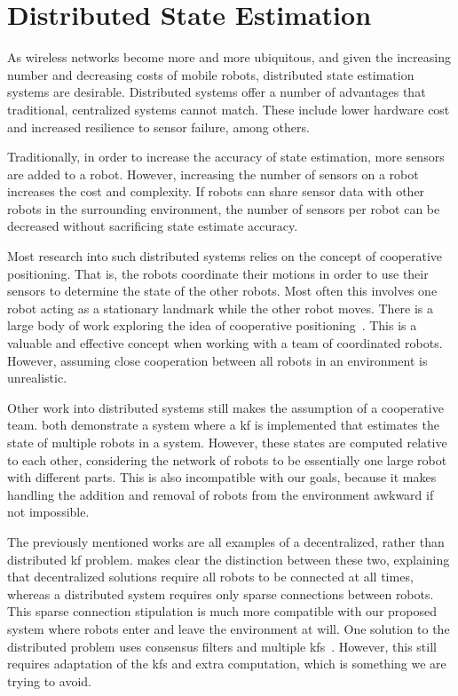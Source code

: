 \documentclass[thesis.tex]{subfile}
\begin{document}
\section{Distributed State Estimation}
As wireless networks become more and more ubiquitous, and given the increasing number and decreasing costs of mobile robots, distributed state estimation systems are desirable. Distributed systems offer a number of advantages that traditional, centralized systems cannot match. These include lower hardware cost and increased resilience to sensor failure, among others.

Traditionally, in order to increase the accuracy of state estimation, more sensors are added to a robot. However, increasing the number of sensors on a robot increases the cost and complexity. If robots can share sensor data with other robots in the surrounding environment, the number of sensors per robot can be decreased without sacrificing state estimate accuracy.

Most research into such distributed systems relies on the concept of cooperative positioning. That is, the robots coordinate their motions in order to use their sensors to determine the state of the other robots. Most often this involves one robot acting as a stationary landmark while the other robot moves.  There is a large body of work exploring the idea of cooperative positioning~\cite{Kurazume1994, Kurazume1996, Kurazume1998, Kurazume2000}. This is a valuable and effective concept when working with a team of coordinated robots. However, assuming close cooperation between all robots in an environment is unrealistic.

Other work into distributed systems still makes the assumption of a cooperative team. \textcite{Sanderson1997, Roumeliotis2002} both demonstrate a system where a \gls{kf} is implemented that estimates the state of multiple robots in a system. However, these states are computed relative to each other, considering the network of robots to be essentially one large robot with different parts. This is also incompatible with our goals, because it makes handling the addition and removal of robots from the environment awkward if not impossible.

The previously mentioned works are all examples of a decentralized, rather than distributed \gls{kf} problem. \textcite{Olfati-Saber2005} makes clear the distinction between these two, explaining that decentralized solutions require all robots to be connected at all times, whereas a distributed system requires only sparse connections between robots. This sparse connection stipulation is much more compatible with our proposed system where robots enter and leave the environment at will. One solution to the distributed problem uses consensus filters and multiple \glspl{kf}~\cite{Olfati-Saber2005}. However, this still requires adaptation of the \glspl{kf} and extra computation, which is something we are trying to avoid.
\end{document}
